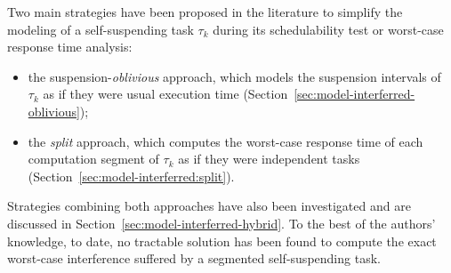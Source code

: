 
\label{sec:model-interferred}

Two main strategies have been proposed in the literature to simplify the modeling of a self-suspending task $\tau_k$ during its schedulability test or worst-case response time analysis:
\begin{itemize}
\item the suspension-\emph{oblivious} approach, which models the suspension intervals of $\tau_k$ as if they were usual execution time (Section~\ref{sec:model-interferred-oblivious});
\item the \emph{split} approach, which computes the worst-case response time of each computation segment of $\tau_k$ as if they were independent tasks (Section~\ref{sec:model-interferred:split}).
\end{itemize}
Strategies combining both approaches have also been investigated and are discussed in Section~\ref{sec:model-interferred-hybrid}.
 To the best of the authors' knowledge, to date, no tractable solution has been found to compute the exact worst-case interference suffered by a segmented self-suspending task. 




